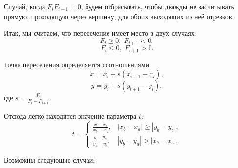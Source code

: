 Случай, когда \( F_i F_{i+1} = 0 \), будем отбрасывать, чтобы дважды не засчитывать прямую, проходящую через вершину, для обоих выходящих из неё отрезков.

Итак, мы считаем, что пересечение имеет место в двух случаях:
\[
F_i \geq 0, \; F_{i+1} < 0,
\]
\[
F_i \leq 0, \; F_{i+1} > 0.
\]

Точка пересечения определяется соотношениями
\[
x = x_i + s(x_{i+1} - x_i),
\]
\[
y = y_i + s(y_{i+1} - y_i),
\]
где \( s = \frac{F_i}{F_i - F_{i+1}} \).

Отсюда легко находится значение параметра \( t \):
\[
t = 
\begin{cases} 
    \frac{x - x_a}{x_b - x_a}, & |x_b - x_a| \geq |y_b - y_a|, \\ 
    \frac{y - y_a}{y_b - y_a}, & |y_b - y_a| > |x_b - x_a|. 
\end{cases}
\]

Возможны следующие случаи:

